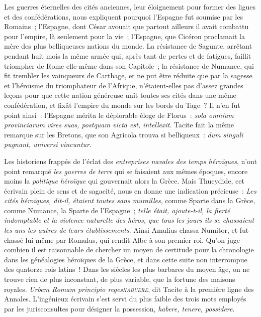 \documentclass[french,twoside]{book} %
\begin{document}
Les guerres éternelles des cités anciennes, leur  éloignement pour former des ligues et des confédérations, nous expliquent pourquoi l’Espagne fut soumise par les Romains ; l’Espagne, dont César avouait que partout ailleurs il avait combattu pour l’empire, là seulement pour la vie ; l’Espagne, que Cicéron proclamait la mère des plus belliqueuses nations du monde. La résistance de Sagunte, arrêtant pendant huit mois la même armée qui, après tant de pertes et de fatigues, faillit triompher de Rome elle-même dans son Capitole ; la résistance de Numance, qui fit trembler les vainqueurs de Carthage, et ne put être réduite que par la sagesse et l’héroïsme du triomphateur de l’Afrique, n’étaient-elles pas d’assez grandes leçons pour que cette nation généreuse unît toutes ses cités dans une même confédération, et fixât l’empire du monde sur les bords du Tage ? Il n’en fut point ainsi : l’Espagne mérita le déplorable éloge de Florus : \emph{{\itshape sola omnium provinciarum vires suas, postquam victa est, intellexit}}. Tacite fait la même remarque sur les Bretons, que son Agricola trouva si belliqueux : \emph{{\itshape dum singuli pugnant, universi vincuntur}}.\par
Les historiens frappés de l’éclat des {\itshape entreprises navales des temps héroïques}, n’ont point remarqué {\itshape les guerres de terre} qui se faisaient aux mêmes époques, encore moins la {\itshape politique héroïque} qui gouvernait alors la Grèce. Mais Thucydide, cet écrivain plein de sens et de sagacité, nous en donne une indication précieuse : \emph{{\itshape Les cités héroïques}, dit-il, {\itshape  étaient toutes sans murailles}}, comme Sparte dans  la Grèce, comme Numance, la Sparte de l’Espagne ; \emph{{\itshape telle était}, ajoute-t-il, {\itshape  la fierté indomptable et la violence naturelle des héros, que tous les jours ils se chassaient les uns les autres de leurs établissements}}. Ainsi Amulius chassa Numitor, et fut chassé lui-même par Romulus, qui rendit Albe à son premier roi. Qu’on juge combien il est raisonnable de chercher un moyen de certitude pour la chronologie dans les généalogies héroïques de la Grèce, et dans cette suite non interrompue des quatorze rois latins ! Dans les siècles les plus barbares du moyen âge, on ne trouve rien de plus inconstant, de plus variable, que la fortune des maisons royales. \emph{{\itshape Urbem Romam principio reges}{\scshape habuere}}, dit Tacite à la première ligne des Annales. L’ingénieux écrivain s’est servi du plus faible des trois mots employés par les jurisconsultes pour désigner la possession, {\itshape habere, tenere, possidere}.
\end{document}
